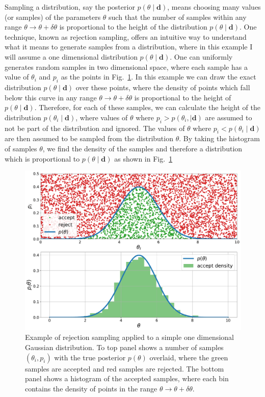 Sampling a distribution, say the posterior $p(\theta \mid \bm{d})$, means choosing many values (or samples) of the parameters $\theta$ such that the number of samples within any range $\theta \rightarrow \theta + \delta \theta$ is proportional to the height of the distribution $p(\theta \mid \bm{d})$.
One technique, known as rejection sampling, offers an intuitive way to understand what it means to generate samples from a distribution, where in this example I will assume a one dimensional distribution $p(\theta \mid \bm{d})$.
One can uniformly generates random samples in two dimensional space, where each sample has a value of $\theta_i$ and $p_i$ as the points in Fig.~\ref{cwinto:bayes:sampling:rejection}.
In this example we can draw the exact distribution $p(\theta \mid \bm{d})$ over these points, where the density of points which fall below this curve in any range $\theta \rightarrow \theta + \delta \theta$ is proportional to the height of $p(\theta \mid \bm{d})$.
Therefore, for each of these samples, we can calculate the height of the distribution $p(\theta_i \mid \bm{d})$, where values of $\theta$ where $p_i > p(\theta_i, \mid \bm{d})$ are assumed to not be part of the distribution and ignored.
The values of $\theta$ where $p_i < p(\theta_i \mid \bm{d})$ are then assumed to be sampled from the distribution $\theta$.
By taking the histogram of samples $\theta$, we find the density of the samples and therefore a distribution which is proportional to $p(\theta \mid \bm{d})$ as shown in Fig.~\ref{cwinto:bayes:sampling:rejection} 
%
\begin{figure}[ht]
	\centering
	\includegraphics[width=0.8\linewidth]{C2_cw/reject_sample.pdf}
	\caption[Rejection sampling example]{Example of rejection sampling applied to a simple one dimensional Gaussian distribution. To top panel shows a number of samples $(\theta_i, p_i)$ with the true posterior $p(\theta)$ overlaid, where the green samples are accepted and red samples are rejected. The bottom panel shows a histogram of the accepted samples, where each bin contains the density of points in the range $\theta \rightarrow \theta + \delta \theta$.}
	\label{cwinto:bayes:sampling:rejection}
\end{figure}
%

